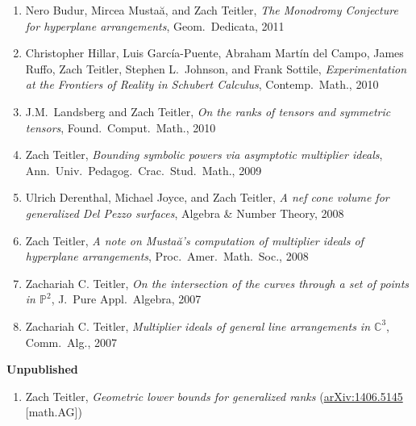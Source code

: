 \documentclass[12pt]{article}
\begin{document}
\begin{enumerate}
\item
Nero Budur, Mircea Musta\u{a}, and Zach Teitler,
\emph{The Monodromy Conjecture for hyperplane arrangements},
Geom.\ Dedicata,
2011

\item
Christopher Hillar, Luis Garc\'ia-Puente, Abraham Mart\'in del Campo, James Ruffo, Zach Teitler,
Stephen L.\ Johnson, and Frank Sottile,
\emph{Experimentation at the Frontiers of Reality in Schubert Calculus},
Contemp.\ Math.,
2010

\item J.M.~Landsberg and Zach Teitler,
\emph{On the ranks of tensors and symmetric tensors},
Found.\ Comput.\ Math.,
2010

\item Zach Teitler,
\emph{Bounding symbolic powers via asymptotic multiplier ideals},
Ann.\ Univ.\ Pedagog.\ Crac.\ Stud.\ Math.,
2009

\item Ulrich Derenthal, Michael Joyce, and Zach Teitler,
\emph{A nef cone volume for generalized Del Pezzo surfaces},
Algebra \& Number Theory,
2008

\item Zach Teitler,
\emph{A note on Musta\u{a}'s computation of multiplier ideals of hyperplane arrangements},
Proc.\ Amer.\ Math.\ Soc.,
2008

\item Zachariah C. Teitler,
\emph{On the intersection of the curves through a set of points in $\mathbb{P}^2$},
J.\ Pure Appl.\ Algebra,
2007

\item Zachariah C. Teitler,
\emph{Multiplier ideals of general line arrangements in $\mathbb{C}^3$},
Comm.\ Alg.,
2007

\end{enumerate}


\textbf{Unpublished}
\begin{enumerate}
\item Zach Teitler,
\emph{Geometric lower bounds for generalized ranks} %
(\href{http://arxiv.org/abs/1406.5145}{arXiv:1406.5145} [math.AG])
\end{enumerate}
\end{document}
